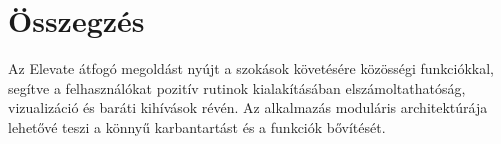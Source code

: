 \documentclass[12pt,a4paper]{report}
\begin{document}
\chapter{Összegzés}
Az Elevate átfogó megoldást nyújt a szokások követésére közösségi funkciókkal, segítve a felhasználókat pozitív rutinok kialakításában elszámoltathatóság, vizualizáció és baráti kihívások révén. Az alkalmazás moduláris architektúrája lehetővé teszi a könnyű karbantartást és a funkciók bővítését.
\end{document}
